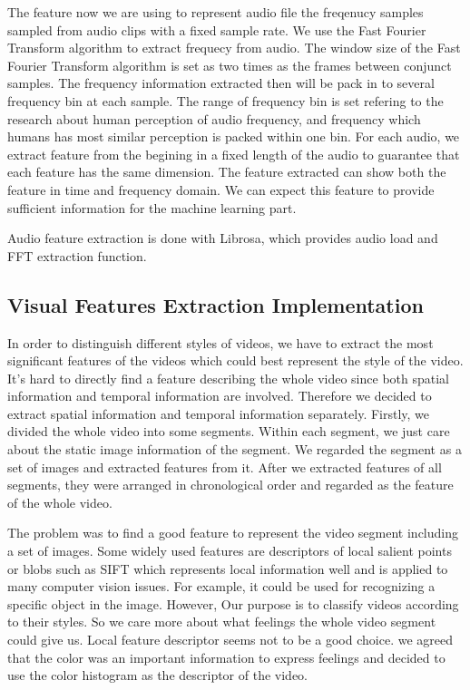 \documentclass{report}
\begin{document}
The feature now we are using to represent audio file the freqenucy samples sampled from audio clips with a fixed sample rate. We use the Fast Fourier Transform algorithm to extract frequecy from audio. The window size of the Fast Fourier Transform algorithm is set as two times as the frames between conjunct samples. The frequency information extracted then will be pack in to several frequency bin at each sample. The range of frequency bin is set refering to the research about human perception of audio frequency, and frequency which humans has most similar perception is packed within one bin. For each audio, we extract feature from the begining in a fixed length of the audio to guarantee that each feature has the same dimension. The feature extracted can show both the feature in time and frequency domain. We can expect this feature to provide sufficient information for the machine learning part. 

Audio feature extraction is done with Librosa, which provides audio load and FFT extraction function.

\subsection{Visual Features Extraction Implementation}

In order to distinguish different styles of videos, we have to extract the most significant features of the videos which could best represent the style of the video. It's hard to directly find a feature describing the whole video since both spatial information and temporal information are involved. Therefore we decided to extract spatial information and temporal information separately. Firstly, we divided the whole video into some segments. Within each segment, we just care about the static image information of the segment. We regarded the segment as a set of images and extracted features from it. After we extracted features of all segments, they were arranged in chronological order and regarded as the feature of the whole video.

The problem was to find a good feature to represent the video segment including a set of images. Some widely used features are descriptors of local salient points or blobs such as SIFT which represents local information well and is applied to many computer vision issues. For example, it could be used for recognizing a specific object in the image. However, Our purpose is to classify videos according to their styles. So we care more about what feelings the whole video segment could give us. Local feature descriptor seems not to be a good choice. we agreed that the color was an important information to express feelings and decided to use the color histogram as the descriptor of the video.
\end{document}
